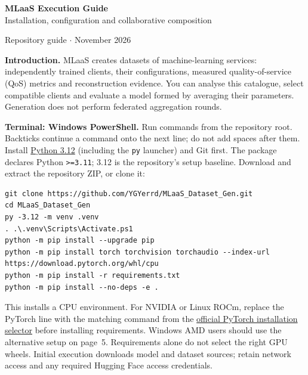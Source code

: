 \documentclass[10pt,a4paper]{article}
\makeatletter
\newcommand{\code}[1]{\nolinkurl{#1}}
\renewcommand\section{\@startsection{section}{1}{0pt}{-1.8ex plus -.2ex}{.7ex}{\normalfont\large\bfseries\color{ink}}}
\makeatother
\begin{document}
\fontsize{9.5}{10.8}\selectfont
\begin{center}
{\LARGE\bfseries\color{ink} MLaaS Execution Guide}\\[3pt]
{\normalsize Installation, configuration and collaborative composition}\par
{\small Repository guide \enspace$\cdot$ November 2026}
\end{center}

\textbf{Introduction.} MLaaS creates datasets of machine-learning services: independently trained clients, their configurations, measured quality-of-service (QoS) metrics and reconstruction evidence. You can analyse this catalogue, select compatible clients and evaluate a model formed by averaging their parameters. Generation does not perform federated aggregation rounds.

\section{Quick Start}
\textbf{Terminal: Windows PowerShell.} Run commands from the repository root. Backticks continue a command onto the next line; do not add spaces after them. Install \href{https://www.python.org/downloads/windows/}{Python 3.12} (including the \code{py} launcher) and Git first. The package declares Python \code{>=3.11}; 3.12 is the repository's setup baseline. Download and extract the repository ZIP, or clone it:
\begin{lstlisting}
git clone https://github.com/YGYerrd/MLaaS_Dataset_Gen.git
cd MLaaS_Dataset_Gen
py -3.12 -m venv .venv
. .\.venv\Scripts\Activate.ps1
python -m pip install --upgrade pip
python -m pip install torch torchvision torchaudio --index-url https://download.pytorch.org/whl/cpu
python -m pip install -r requirements.txt
python -m pip install --no-deps -e .
\end{lstlisting}
This installs a CPU environment. For NVIDIA or Linux ROCm, replace the PyTorch line with the matching command from the \href{https://pytorch.org/get-started/locally/}{official PyTorch installation selector} before installing requirements. Windows AMD users should use the alternative setup on page~5. Requirements alone do not select the right GPU wheels. Initial execution downloads model and dataset sources; retain network access and any required Hugging Face access credentials.
\end{document}
